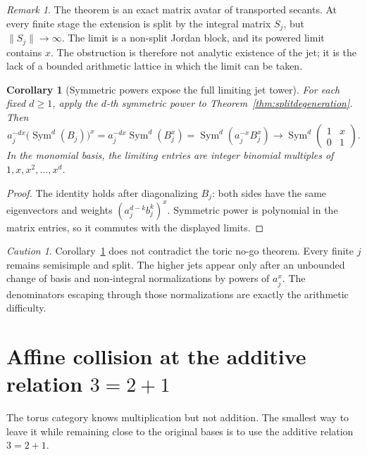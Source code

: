 \documentclass[11pt,oneside]{article}
\newtheorem{corollary}[theorem]{Corollary}
\theoremstyle{definition}
\theoremstyle{remark}
\newtheorem{remark}[theorem]{Remark}
\newtheorem{warning}[theorem]{Caution}
\newcommand{\Sym}{\operatorname{Sym}}
\begin{document}
\begin{remark}
The theorem is an exact matrix avatar of transported secants.  At every finite stage the
extension is split by the integral matrix $S_j$, but $\|S_j\|\to\infty$.  The limit is a
non-split Jordan block, and its powered limit contains $x$.  The obstruction is therefore not
analytic existence of the jet; it is the lack of a bounded arithmetic lattice in which the
limit can be taken.
\end{remark}

\begin{corollary}[Symmetric powers expose the full limiting jet tower]
\label{cor:sympowerjet}
For each fixed $d\ge1$, apply the $d$-th symmetric power to
Theorem~\ref{thm:splitdegeneration}.  Then
\[
 a_j^{-dx}\bigl(\Sym^d(B_j)\bigr)^x
 =a_j^{-dx}\Sym^d(B_j^x)
 =\Sym^d\!\left(a_j^{-x}B_j^x\right)
 \longrightarrow
 \Sym^d\!\begin{pmatrix}1&x\\0&1\end{pmatrix}.
\]
In the monomial basis, the limiting entries are integer binomial multiples of
$1,x,x^2,\dots,x^d$.
\end{corollary}

\begin{proof}
The identity holds after diagonalizing $B_j$: both sides have the same eigenvectors and
weights $(a_j^{d-k}b_j^k)^x$.  Symmetric power is polynomial in the matrix entries, so it
commutes with the displayed limits.
\end{proof}

\begin{warning}
Corollary~\ref{cor:sympowerjet} does not contradict the toric no-go theorem.  Every finite
$j$ remains semisimple and split.  The higher jets appear only after an unbounded change of
basis and non-integral normalizations by powers of $a_j^x$.  The denominators escaping through
those normalizations are exactly the arithmetic difficulty.
\end{warning}

\section{Affine collision at the additive relation \texorpdfstring{$3=2+1$}{3 = 2 + 1}}
\label{sec:affinecollision}

The torus category knows multiplication but not addition.  The smallest way to leave it while
remaining close to the original bases is to use the additive relation $3=2+1$.
\end{document}
